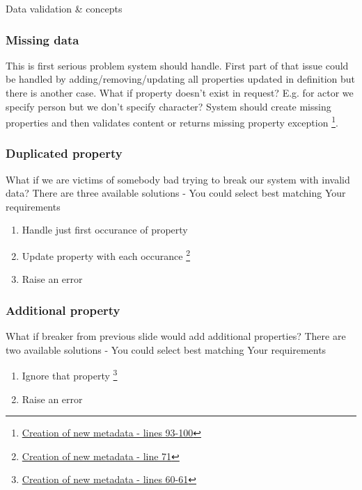 \documentclass{beamer}
\begin{document}
\begin{section}{Data validation \& concepts}
\begin{frame}
\end{frame}

\begin{frame}
\frametitle{Missing data}
This is first serious problem system should handle. First part of that issue could be handled by adding/removing/updating all properties updated in definition but there is another case. \newline
What if property doesn't exist in request? E.g. for actor we specify person but we don't specify character? \newline
System should create missing properties and then validates content or returns missing property exception \footnote[1]{\href{https://github.com/paqaos/DynamicMetadata-SFI2021/blob/main/MovieDatabase/MovieDatabase/CommandStack/CommandHandlers/MovieMetadatas/CreateMovieMetadataCommandHandler.cs}{Creation of new metadata - lines 93-100}}.
\end{frame}

\begin{frame}
\frametitle{Duplicated property}
What if we are victims of somebody bad trying to break our system with invalid data? \newline
There are three available solutions - You could select best matching Your requirements \newline
\begin{enumerate}
	\item Handle just first occurance of property
	\item Update property with each occurance \footnote[1]{\href{https://github.com/paqaos/DynamicMetadata-SFI2021/blob/main/MovieDatabase/MovieDatabase/CommandStack/CommandHandlers/MovieMetadatas/CreateMovieMetadataCommandHandler.cs}{Creation of new metadata - line 71}}
	\item Raise an error
\end{enumerate}
\end{frame}

\begin{frame}
\frametitle{Additional property}
What if breaker from previous slide would add additional properties? \newline
There are two available solutions - You could select best matching Your requirements \newline
\begin{enumerate}
	\item Ignore that property \footnote[1]{\href{https://github.com/paqaos/DynamicMetadata-SFI2021/blob/main/MovieDatabase/MovieDatabase/CommandStack/CommandHandlers/MovieMetadatas/CreateMovieMetadataCommandHandler.cs}{Creation of new metadata - lines 60-61}} 
	\item Raise an error
\end{enumerate}
\end{frame}


\end{section}
\end{document}
